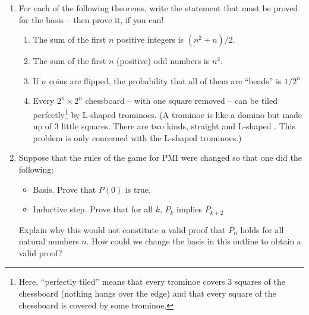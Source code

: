 \begin{enumerate}
\begin{proof}
\end{proof}
\medskip
   
\item For each of the following theorems, write the statement that must be
proved for the basis -- then prove it, if you can!

\begin{enumerate}
\item The sum of the first $n$ positive integers is $(n^2+n)/2$.
\item The sum of the first $n$ (positive) odd numbers is $n^2$.
\item If $n$ coins are flipped, the probability that all of them 
are ``heads'' is $1/2^n$
\item Every $2^n \times 2^n$ chessboard -- with one square removed -- can 
be tiled perfectly\footnote{Here, ``perfectly tiled'' means that every trominoe
covers 3 squares of the chessboard (nothing hangs over the edge) and that every
square of the chessboard is covered by some trominoe.} by L-shaped trominoes.  
(A trominoe is like a domino but 
made up of $3$ little squares.  There are two kinds, straight 
 and L-shaped 
. This problem is only concerned with
the L-shaped trominoes.)
\end{enumerate}

\item Suppose that the rules of the game for PMI were changed so that one
did the following:
\begin{itemize}
\item Basis.  Prove that $P(0)$ is true.
\item Inductive step.  Prove that for all $k$, $P_k$ implies $P_{k+2}$
\end{itemize}

\noindent Explain why this would not constitute a valid proof that $P_n$ holds 
for all natural numbers $n$. 
\noindent How could we change the basis in this outline to obtain a valid proof?

\end{enumerate}




